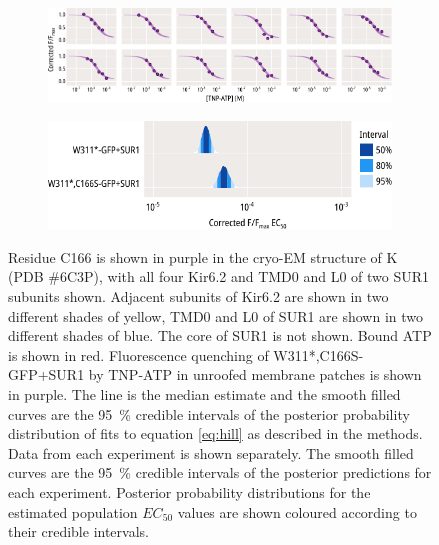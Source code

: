\begin{figure}[hbtp]
\begin{subfigure}[t]{0.45\textwidth}
	\end{subfigure}
	\vfill
	\begin{subfigure}[t]{0.9\textwidth}
		\caption{}\label{ch5fig:c166s_indfits}
		\centering
		\includegraphics[width=\textwidth]{c166s_3.pdf}
	\end{subfigure}
	\vfill
	\begin{subfigure}[t]{0.7\textwidth}
		\caption{}\label{ch5fig:c166s_params}
		\centering
		\includegraphics[width=\textwidth]{c166s_4.pdf}
	\end{subfigure}
	\caption[C166S does not alter nucleotide binding at Kir6.2]{
	{\bf{}}
	 Residue C166 is shown in purple in the cryo-EM structure of K\ATP{} (PDB \#6C3P), with all four Kir6.2 and TMD0 and L0 of two SUR1 subunits shown.
	Adjacent subunits of Kir6.2 are shown in two different shades of yellow, TMD0 and L0 of SUR1 are shown in two different shades of blue.
	The core of SUR1 is not shown.
	Bound ATP is shown in red.
	 Fluorescence quenching of W311*,C166S-GFP+SUR1 by TNP-ATP in unroofed membrane patches is shown in purple.
	The line is the median estimate and the smooth filled curves are the \SI{95}{\percent} credible intervals of the posterior probability distribution of fits to equation \ref{eq:hill} as described in the methods.
	 Data from each experiment is shown separately.
	The smooth filled curves are the \SI{95}{\percent} credible intervals of the posterior predictions for each experiment.
	 Posterior probability distributions for the estimated population $EC_{50}$ values are shown coloured according to their credible intervals.
	}\label{ch5fig:c166s_1}
\end{figure}

